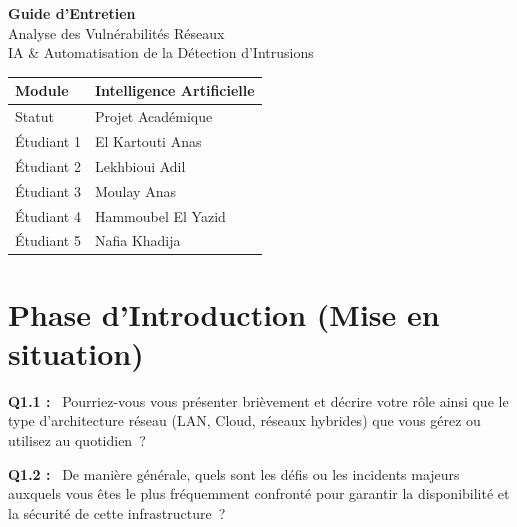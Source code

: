 \documentclass[12pt,a4paper]{article}
\newcommand{\og}{\guillemotleft\,}
\newcommand{\fg}{\,\guillemotright}
\begin{document}
\begin{center}
  {\Large\bfseries Guide d'Entretien}\\[0.4em]
  {\large Analyse des Vuln\'{e}rabilit\'{e}s R\'{e}seaux}\\[0.2em]
  {\normalsize IA \& Automatisation de la D\'{e}tection d'Intrusions}\\[1em]
\end{center}

\begin{tabular}{@{}B{3cm} L{10cm}@{}}
  \hline
  Module    & Intelligence Artificielle \\
  \hline
  Statut    & Projet Acad\'{e}mique \\
  \hline
  \'{E}tudiant 1 & El Kartouti Anas \\
  \hline
  \'{E}tudiant 2 & Lekhbioui Adil \\
  \hline
  \'{E}tudiant 3 & Moulay Anas \\
  \hline
  \'{E}tudiant 4 & Hammoubel El Yazid \\
  \hline
  \'{E}tudiant 5 & Nafia Khadija \\
  \hline
\end{tabular}

\vspace{1.2em}

\section{Phase d'Introduction (Mise en situation)}

\textbf{Q1.1 :} \og{} Pourriez-vous vous pr\'{e}senter bri\`{e}vement et d\'{e}crire votre r\^{o}le ainsi que le type
d'architecture r\'{e}seau (LAN, Cloud, r\'{e}seaux hybrides) que vous g\'{e}rez ou utilisez au
quotidien~? \fg{}

\bigskip

\textbf{Q1.2 :} \og{} De mani\`{e}re g\'{e}n\'{e}rale, quels sont les d\'{e}fis ou les incidents majeurs auxquels vous
\^{e}tes le plus fr\'{e}quemment confront\'{e} pour garantir la disponibilit\'{e} et la s\'{e}curit\'{e} de
cette infrastructure~? \fg{}

\end{document}
